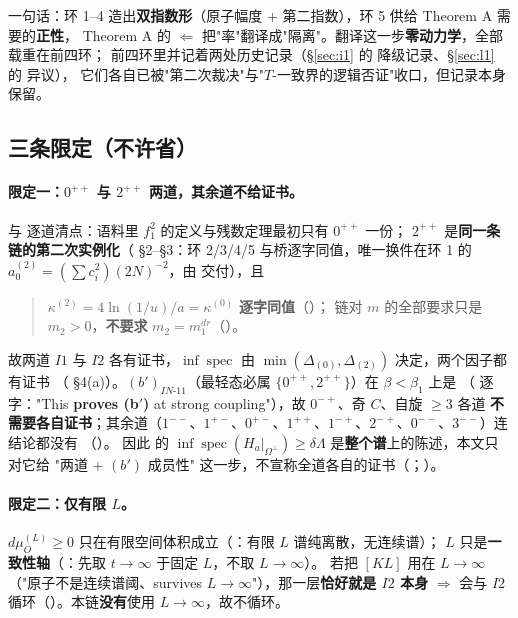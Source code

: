 一句话：环 1--4 造出\textbf{双指数形}（原子幅度 + 第二指数），环 5 供给 Theorem A 需要的\textbf{正性}，
Theorem A 的 $\Leftarrow$ 把"率"翻译成"隔离"。翻译这一步\textbf{零动力学}，全部载重在前四环；
前四环里并记着两处历史记录（\S\ref{sec:i1} 的  降级记录、\S\ref{sec:l1} 的  异议），
它们各自已被"第二次裁决"与"$T$-一致界的逻辑否证"收口，但记录本身保留。

\subsection{三条限定（不许省）}\label{sec:limits}

\paragraph{限定一：$0^{++}$ 与 $2^{++}$ 两道，其余道不给证书。}\LT
{} 与  逐道清点：语料里 $f_1^2$ 的定义与残数定理最初只有 $0^{++}$ 一份；
$2^{++}$ 是\textbf{同一条链的第二次实例化}（ \S2--\S3：环 2/3/4/5 与桥逐字同值，唯一换件在环 1 的
$a_0^{(2)}=(\sum c_i^2)(2N)^{-2}$，由  交付），且
\begin{quote}\small
$\kappa^{(2)}=4\ln(1/u)/a=\kappa^{(0)}$ \textbf{逐字同值}（）；
链对 $m$ 的全部要求只是 $m_2>0$，\textbf{不要求} $m_2=m_1^{dr}$（）。
\end{quote}
故两道 $I1$ 与 $I2$ 各有证书，$\inf\operatorname{spec}$ 由 $\min(\Delta_{(0)},\Delta_{(2)})$ 决定，两个因子都有证书
（ \S4(a)）。$(b')_{IN\text{-}11}$（最轻态必属 $\{0^{++},2^{++}\}$）在 $\beta<\beta_1$ 上是 \LT
（ 逐字："This \textbf{proves (b$'$)} at strong coupling"），故 $0^{-+}$、奇 $C$、自旋 $\ge3$ 各道
\textbf{不需要各自证书}；其余道（$1^{--}$、$1^{+-}$、$0^{+-}$、$1^{++}$、$1^{-+}$、$2^{-+}$、$0^{--}$、$3^{--}$）连结论都没有
（）。
因此  的
$\inf\operatorname{spec}(H_a|_{\Omega^\perp})\ge\delta\Lambda$ 是\textbf{整个谱}上的陈述，本文只对它给
"两道 + $(b')$ 成员性" 这一步，不宣称全道各自的证书（；）。

\paragraph{限定二：仅有限 $L$。}\LT
$d\mu_O^{(L)}\ge0$ 只在有限空间体积成立（：有限 $L$ 谱纯离散，无连续谱）；
$L$ 只是\textbf{一致性轴}（：先取 $t\to\infty$ 于固定 $L$，不取 $L\to\infty$）。
若把 $[KL]$ 用在 $L\to\infty$（"原子不是连续谱阈、survives $L\to\infty$"），那一层\textbf{恰好就是 $I2$ 本身}
$\Rightarrow$ 会与 $I2$ 循环（）。本链\textbf{没有}使用 $L\to\infty$，故不循环。

